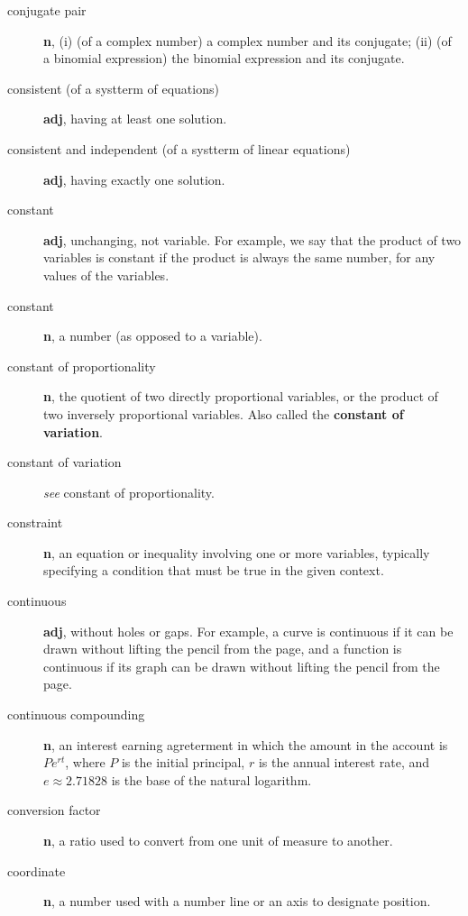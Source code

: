 \documentclass[10pt,]{book}
\newcommand{\terminology}[1]{\textbf{#1}}
\theoremstyle{plain}
\theoremstyle{definition}
\theoremstyle{definition}
\theoremstyle{definition}
\numberwithin{equation}{part}
\begin{document}
\begin{description}
\item[{conjugate pair}]\hypertarget{li-514}{}\terminology{n}, (i) (of a complex number) a complex number and its conjugate; (ii) (of a binomial expression) the binomial expression and its conjugate.%
\item[{consistent (of a systterm of equations)}]\hypertarget{li-515}{}\terminology{adj}, having at least one solution.%
\item[{consistent and independent (of a systterm of linear equations)}]\hypertarget{li-516}{}\terminology{adj}, having exactly one solution.%
\item[{constant}]\hypertarget{li-517}{}\terminology{adj}, unchanging, not variable. For example, we say that the product of two variables is constant if the product is always the same number, for any values of the variables.%
\item[{constant}]\hypertarget{li-518}{}\terminology{n}, a number (as opposed to a variable).%
\item[{constant of proportionality}]\hypertarget{li-519}{}\terminology{n}, the quotient of two directly proportional variables, or the product of two inversely proportional variables. Also called the \terminology{constant of variation}.%
\item[{constant of variation}]\hypertarget{li-520}{}\emph{see} constant of proportionality.%
\item[{constraint}]\hypertarget{li-521}{}\terminology{n}, an equation or inequality involving one or more variables, typically specifying a condition that must be true in the given context.%
\item[{continuous}]\hypertarget{li-522}{}\terminology{adj}, without holes or gaps. For example, a curve is continuous if it can be drawn without lifting the pencil from the page, and a function is continuous if its graph can be drawn without lifting the pencil from the page.%
\item[{continuous compounding}]\hypertarget{li-523}{}\terminology{n}, an interest earning agreterment in which the amount in the account is \(Pe^{rt}\), where \(P\) is the initial principal, \(r\) is the annual interest rate, and \(e\approx 2.71828\) is the base of the natural logarithm.%
\item[{conversion factor}]\hypertarget{li-524}{}\terminology{n}, a ratio used to convert from one unit of measure to another.%
\item[{coordinate}]\hypertarget{li-525}{}\terminology{n}, a number used with a number line or an axis to designate position.%

\end{description}
\end{document}
